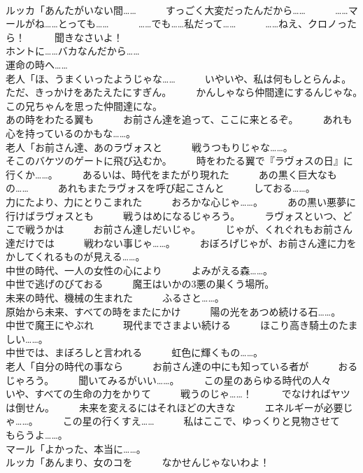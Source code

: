 \documentclass[8pt]{extreport}
\begin{document}
\begin{CJK}{UTF8}{min}
\\	ルッカ「あんたがいない間……　　　すっごく大変だったんだから……　　　……マールがね……とっても……　　　……でも……私だって……　　　……ねえ、クロノったら！　　　聞きなさいよ！	
\\	ホントに……バカなんだから……	
\\	運命の時へ……	
\\	老人「ほ、うまくいったようじゃな……　　　いやいや、私は何もしとらんよ。　　　ただ、きっかけをあたえたにすぎん。　　　かんしゃなら仲間達にするんじゃな。　　　この兄ちゃんを思った仲間達にな。	
\\	あの時をわたる翼も　　　お前さん達を追って、ここに来とるぞ。　　　あれも心を持っているのかもな……。	
\\	老人「お前さん達、あのラヴォスと　　　戦うつもりじゃな……。	
\\	そこのバケツのゲートに飛び込むか。　　　時をわたる翼で『ラヴォスの日』に　　　行くか……。　　　あるいは、時代をまたがり現れた　　　あの黒く巨大なもの……　　　あれもまたラヴォスを呼び起こさんと　　　しておる……。	
\\	力にたより、力にとりこまれた　　　おろかな心じゃ……。　　　あの黒い悪夢に行けばラヴォスとも　　　戦うはめになるじゃろう。　　　ラヴォスといつ、どこで戦うかは　　　お前さん達しだいじゃ。　　　じゃが、くれぐれもお前さん達だけでは　　　戦わない事じゃ……。　　　おぼろげじゃが、お前さん達に力を　　　かしてくれるものが見える……。	
\\	中世の時代、一人の女性の心により　　　よみがえる森……。	
\\	中世で逃げのびておる　　　魔王はいかの3悪の巣くう場所。	
\\	未来の時代、機械の生まれた　　　ふるさと……。	
\\	原始から未来、すべての時をまたにかけ　　　陽の光をあつめ続ける石……。	
\\	中世で魔王にやぶれ　　　現代までさまよい続ける　　　ほこり高き騎土のたましい……。	
\\	中世では、まぼろしと言われる　　　虹色に輝くもの……。	
\\	老人「自分の時代の事なら　　　お前さん達の中にも知っている者が　　　おるじゃろう。　　　聞いてみるがいい……。　　　この星のあらゆる時代の人々　　　いや、すべての生命の力をかりて　　　戦うのじゃ……！　　　でなければヤツは倒せん。　　　未来を変えるにはそれほどの大きな　　　エネルギーが必要じゃ……。　　　この星の行くすえ……　　　私はここで、ゆっくりと見物させて　　　もらうよ……。	
\\	マール「よかった、本当に……。	
\\	ルッカ「あんまり、女のコを　　　なかせんじゃないわよ！	

\end{CJK}
\end{document}
